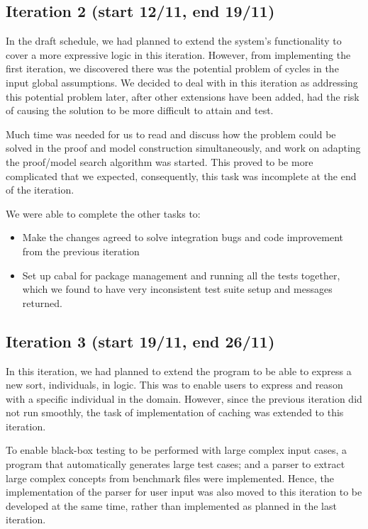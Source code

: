 \subsection*{Iteration 2 (start 12/11, end 19/11)}

In the draft schedule, we had planned to extend the system's functionality to cover a more expressive logic in this iteration. However, from implementing the first iteration, we discovered there was the potential problem of cycles in the input global assumptions. We decided to deal with in this iteration as addressing this potential problem later, after other extensions have been added, had the risk of causing the solution to be more difficult to attain and test. 

Much time was needed for us to read and discuss how the problem could be solved in the proof and model construction simultaneously, and work on adapting the proof/model search algorithm was started. This proved to be more complicated that we expected, consequently, this task was incomplete at the end of the iteration.

We were able to complete the other tasks to:
\begin{itemize}
\item Make the changes agreed to solve integration bugs and code improvement from the previous iteration
\item Set up cabal for package management and running all the tests together, which we found to have very inconsistent test suite setup and messages returned.
\end{itemize}

\subsection*{Iteration 3 (start 19/11, end 26/11)}

In this iteration, we had planned to extend the program to be able to express a new sort, individuals, in logic. This was to enable users to express and reason with a specific individual in the domain. However, since the previous iteration did not run smoothly, the task of implementation of caching was extended to this iteration.

To enable black-box testing to be performed with large complex input cases, a program that automatically generates large test cases; and a parser to extract large complex concepts from benchmark files were implemented. Hence, the implementation of the parser for user input was also moved to this iteration to be developed at the same time, rather than implemented as planned in the last iteration.


